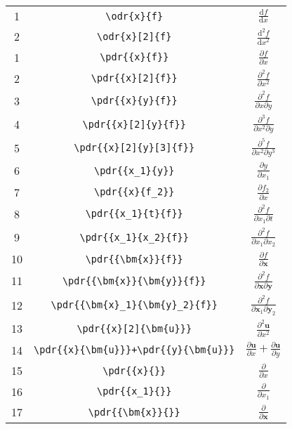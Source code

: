 \documentclass{jsarticle}
\renewcommand{\d}{\textrm{d}}
\begin{document}
%
\begin{table}[htpt]
\centering
\begin{tabular}{ccc}
1&	\verb|\odr{x}{f}|				& $\displaystyle \frac{\d f}{\d x}$ \\[3mm]
2&	\verb|\odr{x}[2]{f}|			& $\displaystyle \frac{\d^2 f}{\d x^2}$ \\[3mm]
\hline
1&	\verb|\pdr{{x}{f}}|					& $\displaystyle \frac{\partial f}{\partial x}$ \\[3mm]
2&	\verb|\pdr{{x}[2]{f}}|				& $\displaystyle \frac{\partial^2 f}{\partial x^2}$ \\[3mm]
3&	\verb|\pdr{{x}{y}{f}}|				& $\displaystyle \frac{\partial^2 f}{\partial x \partial y}$ \\[3mm]
4&	\verb|\pdr{{x}[2]{y}{f}}|			& $\displaystyle \frac{\partial^3 f}{\partial x^2 \partial y}$ \\[3mm]
5&	\verb|\pdr{{x}[2]{y}[3]{f}}|		& $\displaystyle \frac{\partial^5 f}{\partial x^2 \partial y^3}$ \\[3mm]
6&	\verb|\pdr{{x_1}{y}}|				& $\displaystyle \frac{\partial y}{\partial x_1}$ \\[3mm]
7&	\verb|\pdr{{x}{f_2}}|				& $\displaystyle \frac{\partial f_2}{\partial x}$ \\[3mm]
8&	\verb|\pdr{{x_1}{t}{f}}|			& $\displaystyle \frac{\partial^2 f}{\partial x_1 \partial t}$ \\[3mm]
9&	\verb|\pdr{{x_1}{x_2}{f}}|			& $\displaystyle \frac{\partial^2 f}{\partial x_1 \partial x_2}$ \\[3mm]
10&	\verb|\pdr{{\bm{x}}{f}}|			& $\displaystyle \frac{\partial f}{\partial \bm{x}}$ \\[3mm]
11&	\verb|\pdr{{\bm{x}}{\bm{y}}{f}}|	& $\displaystyle \frac{\partial^2 f}{\partial \bm{x} \partial \bm{y}}$ \\[3mm]
12&	\verb|\pdr{{\bm{x}_1}{\bm{y}_2}{f}}|& $\displaystyle \frac{\partial^2 f}{\partial \bm{x}_1 \partial \bm{y}_2}$ \\[3mm]
13&	\verb|\pdr{{x}[2]{\bm{u}}}|			& $\displaystyle \frac{\partial^2 \bm{u}}{\partial x^2}$ \\[3mm]
14&	\verb|\pdr{{x}{\bm{u}}}+\pdr{{y}{\bm{u}}}| & $\displaystyle \frac{\partial \bm{u}}{\partial x} + \frac{\partial \bm{u}}{\partial y}$ \\[3mm]
15&	\verb|\pdr{{x}{}}| 					& $\displaystyle \frac{\partial}{\partial x}$ \\[3mm]
16&	\verb|\pdr{{x_1}{}}|				& $\displaystyle \frac{\partial}{\partial x_1}$ \\[3mm]
17&	\verb|\pdr{{\bm{x}}{}}|				& $\displaystyle \frac{\partial}{\partial \bm{x}}$ \\[3mm]
\end{tabular}
\end{table}
\end{document}
